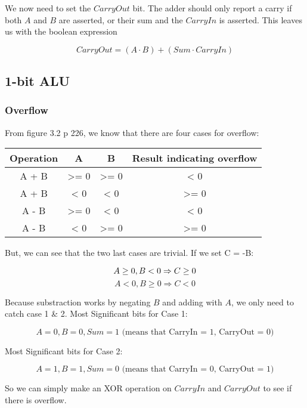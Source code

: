 \documentclass[11pt,a4paper]{article}
\begin{document}
We now need to set the $CarryOut$ bit. The adder should only report a
carry if both $A$ and $B$ are asserted, or their sum and the $CarryIn$ is asserted.
This leaves us with the boolean expression

\begin{equation*}
    CarryOut = (A \cdot B) + (Sum \cdot CarryIn)
\end{equation*}


\subsection*{1-bit ALU} %
\label{sub:1-bit_ALU}

\subsubsection*{Overflow}

From figure 3.2 p 226, we know that there are four cases for overflow:
\begin{table}[htb!]
\begin{tabular}{| c | c | c | c |}
    \centering
    Operation & A & B & Result indicating overflow \\ \hline
    A + B & >= 0 & >= 0 & < 0 \\
    A + B & < 0 & < 0 & >= 0 \\
    A - B & >= 0 & < 0 & < 0 \\
    A - B & < 0 & >= 0 & >= 0 \\
\end{tabular}
\end{table}

But, we can see that the two last cases are trivial. If we set C = -B:

\[
    A \geq 0, B < 0 \Rightarrow C \geq 0 \\
\]
\[
    A < 0, B \geq 0 \Rightarrow C < 0
\]

Because substraction works by negating $B$ and adding with $A$, we only need to catch case 1 \& 2.
Most Significant bits for Case 1:

\[
    A = 0, B = 0, Sum = 1 \text{ (means that CarryIn = 1, CarryOut = 0)}
\]

Most Significant bits for Case 2:

\[
    A = 1, B = 1, Sum = 0 \text{ (means that CarryIn = 0, CarryOut = 1)}
\]

So we can simply make an XOR operation on $CarryIn$ and $CarryOut$ to see if there is overflow.
\end{document}
